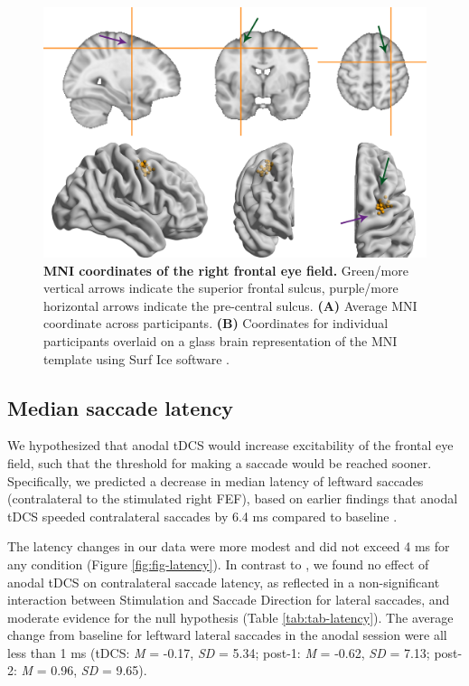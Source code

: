 \documentclass[11pt,english,]{memoir}
\begin{document}
\begin{figure}
\includegraphics[width=130mm]{sacc_tDCS_files/figures/figure_3_FEF} \caption{\textbf{MNI coordinates of the right frontal eye field.} Green/more vertical arrows indicate the superior frontal sulcus, purple/more horizontal arrows indicate the pre-central sulcus. \textbf{(A)} Average MNI coordinate across participants. \textbf{(B)} Coordinates for individual participants overlaid on a glass brain representation of the MNI template using Surf Ice software \autocite{Rorden2017}.}\label{fig:FEF}
\end{figure}



\hypertarget{median-saccade-latency}{%
\subsection{Median saccade latency}\label{median-saccade-latency}}

We hypothesized that anodal tDCS would increase excitability of the frontal eye field, such that the threshold for making a saccade would be reached sooner. Specifically, we predicted a decrease in median latency of leftward saccades (contralateral to the stimulated right FEF), based on earlier findings that anodal tDCS speeded contralateral saccades by 6.4 ms compared to baseline \autocite{Kanai2012}.

The latency changes in our data were more modest and did not exceed 4 ms for any condition (Figure \ref{fig:fig-latency}). In contrast to \textcite{Kanai2012}, we found no effect of anodal tDCS on contralateral saccade latency, as reflected in a non-significant interaction between Stimulation and Saccade Direction for lateral saccades, and moderate evidence for the null hypothesis (Table \ref{tab:tab-latency}). The average change from baseline for leftward lateral saccades in the anodal session were all less than 1 ms (tDCS: \emph{M} = -0.17, \emph{SD} = 5.34; post-1: \emph{M} = -0.62, \emph{SD} = 7.13; post-2: \emph{M} = 0.96, \emph{SD} = 9.65).
\end{document}
